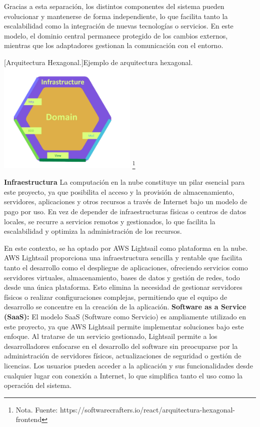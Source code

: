 \begin{itemize}
Gracias a esta separación, los distintos componentes del sistema pueden evolucionar y mantenerse de forma independiente, lo que facilita tanto la escalabilidad como la integración de nuevas tecnologías o servicios. En este modelo, el dominio central permanece protegido de los cambios externos, mientras que los adaptadores gestionan la comunicación con el entorno.

\vspace{2mm}
\begin{minipage}{0.9\textwidth}
    \centering
    [{Arquitectura Hexagonal.}]{Ejemplo de arquitectura hexagonal.}
    \label{hexagonal}
    \includegraphics[width=0.5\textwidth]{Content/Images/hexagonal.png}
    \footnote{Nota. \textup{Fuente: https://softwarecrafters.io/react/arquitectura-hexagonal-frontend}}
\end{minipage}
    
\end{itemize}
\textbf{Infraestructura}
\newline
La computación en la nube constituye un pilar esencial para este proyecto, ya que posibilita el acceso y la provisión de almacenamiento, servidores, aplicaciones y otros recursos a través de Internet bajo un modelo de pago por uso. En vez de depender de infraestructuras físicas o centros de datos locales, se recurre a servicios remotos y gestionados, lo que facilita la escalabilidad y optimiza la administración de los recursos.

En este contexto, se ha optado por AWS Lightsail como plataforma en la nube. AWS Lightsail proporciona una infraestructura sencilla y rentable que facilita tanto el desarrollo como el despliegue de aplicaciones, ofreciendo servicios como servidores virtuales, almacenamiento, bases de datos y gestión de redes, todo desde una única plataforma. Esto elimina la necesidad de gestionar servidores físicos o realizar configuraciones complejas, permitiendo que el equipo de desarrollo se concentre en la creación de la aplicación. 
\newline
\textbf{Software as a Service (SaaS):}
El modelo SaaS (Software como Servicio) es ampliamente utilizado en este proyecto, ya que AWS Lightsail permite implementar soluciones bajo este enfoque. Al tratarse de un servicio gestionado, Lightsail permite a los desarrolladores enfocarse en el desarrollo del software sin preocuparse por la administración de servidores físicos, actualizaciones de seguridad o gestión de licencias. Los usuarios pueden acceder a la aplicación y sus funcionalidades desde cualquier lugar con conexión a Internet, lo que simplifica tanto el uso como la operación del sistema. 

